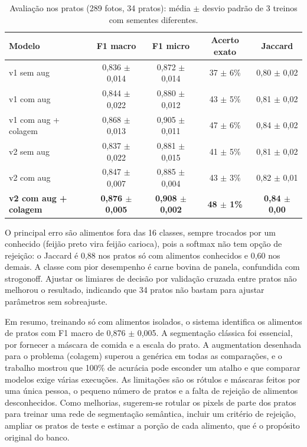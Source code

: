 \documentclass[11pt]{article}
\begin{document}
\begin{table}[!htb]
	\centering
	\caption{Avaliação nos pratos (289 fotos, 34 pratos): média $\pm$ desvio padrão de 3 treinos com sementes diferentes.}
	\label{tab:pratos}
	\small
	\begin{tabular}{lcccc}
		\toprule
		Modelo & F1 macro & F1 micro & Acerto exato & Jaccard \\
		\midrule
		v1 sem aug & 0,836 $\pm$ 0,014 & 0,872 $\pm$ 0,014 & 37 $\pm$ 6\% & 0,80 $\pm$ 0,02 \\
		v1 com aug & 0,844 $\pm$ 0,022 & 0,880 $\pm$ 0,012 & 43 $\pm$ 5\% & 0,81 $\pm$ 0,02 \\
		v1 com aug + colagem & 0,868 $\pm$ 0,013 & 0,905 $\pm$ 0,011 & 47 $\pm$ 6\% & 0,84 $\pm$ 0,02 \\
		\midrule
		v2 sem aug & 0,837 $\pm$ 0,022 & 0,881 $\pm$ 0,015 & 41 $\pm$ 5\% & 0,81 $\pm$ 0,02 \\
		v2 com aug & 0,847 $\pm$ 0,007 & 0,885 $\pm$ 0,004 & 43 $\pm$ 3\% & 0,82 $\pm$ 0,01 \\
		\textbf{v2 com aug + colagem} & \textbf{0,876 $\pm$ 0,005} & \textbf{0,908 $\pm$ 0,002} & \textbf{48 $\pm$ 1\%} & \textbf{0,84 $\pm$ 0,00} \\
		\bottomrule
	\end{tabular}
\end{table}

O principal erro são alimentos fora das 16 classes, sempre trocados por um conhecido (feijão preto vira feijão carioca), pois a softmax não tem opção de rejeição: o Jaccard é 0,88 nos pratos só com alimentos conhecidos e 0,60 nos demais. A classe com pior desempenho é carne bovina de panela, confundida com strogonoff. Ajustar os limiares de decisão por validação cruzada entre pratos não melhorou o resultado, indicando que 34 pratos não bastam para ajustar parâmetros sem sobreajuste.

Em resumo, treinando só com alimentos isolados, o sistema identifica os alimentos de pratos com F1 macro de 0,876 $\pm$ 0,005. A segmentação clássica foi essencial, por fornecer a máscara de comida e a escala do prato. A augmentation desenhada para o problema (colagem) superou a genérica em todas as comparações, e o trabalho mostrou que 100\% de acurácia pode esconder um atalho e que comparar modelos exige várias execuções. As limitações são os rótulos e máscaras feitos por uma única pessoa, o pequeno número de pratos e a falta de rejeição de alimentos desconhecidos. Como melhorias, sugerem-se rotular os pixels de parte dos pratos para treinar uma rede de segmentação semântica, incluir um critério de rejeição, ampliar os pratos de teste e estimar a porção de cada alimento, que é o propósito original do banco.

\let\OLDthebibliography\thebibliography
\renewcommand\thebibliography[1]{\OLDthebibliography{#1}\setlength{\parskip}{0pt}\setlength{\itemsep}{1pt plus 0.3ex}}
{\small


}
\end{document}

